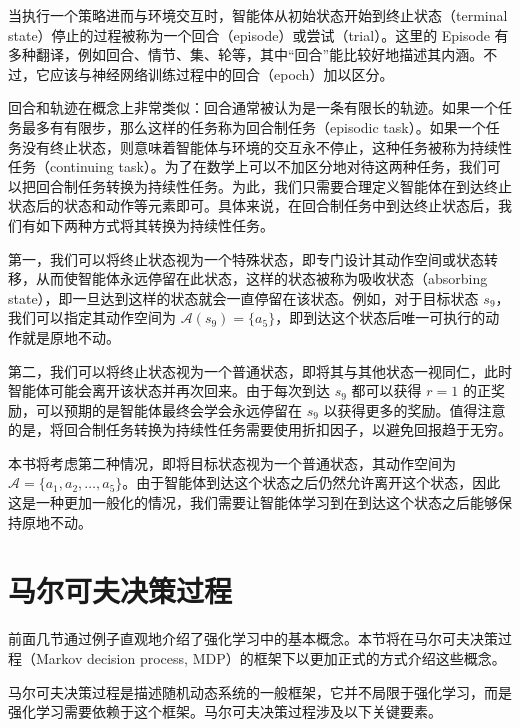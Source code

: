 当执行一个策略进而与环境交互时，智能体从初始状态开始到终止状态（terminal state）停止的过程被称为一个回合（episode）或尝试（trial）。这里的 Episode 有多种翻译，例如回合、情节、集、轮等，其中“回合”能比较好地描述其内涵。不过，它应该与神经网络训练过程中的回合（epoch）加以区分。

回合和轨迹在概念上非常类似：回合通常被认为是一条有限长的轨迹。如果一个任务最多有有限步，那么这样的任务称为回合制任务（episodic task）。如果一个任务没有终止状态，则意味着智能体与环境的交互永不停止，这种任务被称为持续性任务（continuing task）。为了在数学上可以不加区分地对待这两种任务，我们可以把回合制任务转换为持续性任务。为此，我们只需要合理定义智能体在到达终止状态后的状态和动作等元素即可。具体来说，在回合制任务中到达终止状态后，我们有如下两种方式将其转换为持续性任务。

第一，我们可以将终止状态视为一个特殊状态，即专门设计其动作空间或状态转移，从而使智能体永远停留在此状态，这样的状态被称为吸收状态（absorbing state），即一旦达到这样的状态就会一直停留在该状态。例如，对于目标状态 $s_9$，我们可以指定其动作空间为 $\mathcal{A}(s_9) = \{a_5\}$，即到达这个状态后唯一可执行的动作就是原地不动。

第二，我们可以将终止状态视为一个普通状态，即将其与其他状态一视同仁，此时智能体可能会离开该状态并再次回来。由于每次到达 $s_9$ 都可以获得 $r = 1$ 的正奖励，可以预期的是智能体最终会学会永远停留在 $s_9$ 以获得更多的奖励。值得注意的是，将回合制任务转换为持续性任务需要使用折扣因子，以避免回报趋于无穷。

本书将考虑第二种情况，即将目标状态视为一个普通状态，其动作空间为 $\mathcal{A} = \{a_1, a_2, \ldots, a_5\}$。由于智能体到达这个状态之后仍然允许离开这个状态，因此这是一种更加一般化的情况，我们需要让智能体学习到在到达这个状态之后能够保持原地不动。

\section{马尔可夫决策过程}
\label{sec:rl-basic-mdp}

前面几节通过例子直观地介绍了强化学习中的基本概念。本节将在马尔可夫决策过程（Markov decision process, MDP）的框架下以更加正式的方式介绍这些概念。

马尔可夫决策过程是描述随机动态系统的一般框架，它并不局限于强化学习，而是强化学习需要依赖于这个框架。马尔可夫决策过程涉及以下关键要素。

